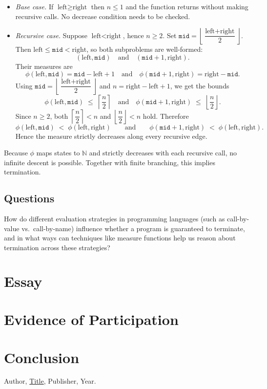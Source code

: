 \documentclass{article}
\theoremstyle{theorem}
\theoremstyle{definition}
\theoremstyle{remark}
\begin{document}
\begin{itemize}
  \item \emph{Base case.} If \(\text{left}\ge \text{right}\) then \(n\le 1\) and the function returns without making recursive calls. No decrease condition needs to be checked.

  \item \emph{Recursive case.} Suppose \(\text{left}<\text{right}\), hence \(n\ge 2\).
  Set \(\texttt{mid}=\left\lfloor \dfrac{\text{left}+\text{right}}{2}\right\rfloor\).
  Then \(\text{left}\le \texttt{mid}<\text{right}\), so both subproblems are well-formed:
  \[
  (\text{left},\texttt{mid}) \quad\text{and}\quad (\texttt{mid}+1,\text{right}).
  \]
  Their measures are
  \[
  \phi(\text{left},\texttt{mid})=\texttt{mid}-\text{left}+1
  \quad\text{and}\quad
  \phi(\texttt{mid}+1,\text{right})=\text{right}-\texttt{mid}.
  \]
  Using \(\texttt{mid}=\left\lfloor \dfrac{\text{left}+\text{right}}{2}\right\rfloor\) and \(n=\text{right}-\text{left}+1\), we get the bounds
  \[
  \phi(\text{left},\texttt{mid}) \;\le\; \left\lceil \frac{n}{2} \right\rceil
  \quad\text{and}\quad
  \phi(\texttt{mid}+1,\text{right}) \;\le\; \left\lfloor \frac{n}{2} \right\rfloor.
  \]
  Since \(n\ge 2\), both \(\left\lceil \dfrac{n}{2}\right\rceil<n\) and \(\left\lfloor \dfrac{n}{2}\right\rfloor<n\) hold. Therefore
  \[
  \phi(\text{left},\texttt{mid}) \;<\; \phi(\text{left},\text{right})
  \qquad\text{and}\qquad
  \phi(\texttt{mid}+1,\text{right}) \;<\; \phi(\text{left},\text{right}).
  \]
  Hence the measure strictly decreases along every recursive edge.
\end{itemize}

Because \(\phi\) maps states to \(\mathbb{N}\) and strictly decreases with each recursive call,
no infinite descent is possible. Together with finite branching, this implies termination.

\subsection{Questions}

How do different evaluation strategies in programming languages (such as call-by-value vs.\ call-by-name) influence whether a program is guaranteed to terminate, and in what ways can techniques like measure functions help us reason about termination across these strategies?

\section{Essay}

\section{Evidence of Participation}

\section{Conclusion}\label{conclusion}

\begin{thebibliography}{99}
 Author, \href{https://en.wikipedia.org/wiki/LaTeX}{Title}, Publisher, Year.
\end{thebibliography}
\end{document}

